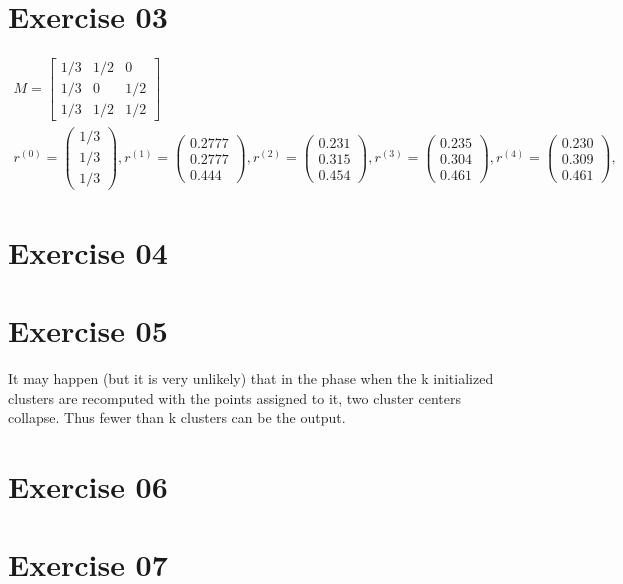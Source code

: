 \documentclass[11pt,a4paper]{scrartcl}
\begin{document}
\section*{Exercise 03}
\begin{align*}
M =
 \begin{bmatrix}
1/3 & 1/2 & 0 \\
1/3 & 0 & 1/2  \\
1/3 & 1/2 & 1/2
\end{bmatrix} \\
r^{(0)} = \left( \begin{array}{c}1/3\\1/3\\1/3\end{array} \right), 
r^{(1)} = \left( \begin{array}{c}0.2777\\0.2777\\0.444\end{array} \right), 
r^{(2)} = \left( \begin{array}{c}0.231\\0.315\\0.454\end{array} \right), 
r^{(3)} = \left( \begin{array}{c}0.235\\0.304\\0.461\end{array} \right), 
r^{(4)} = \left( \begin{array}{c}0.230\\0.309\\0.461\end{array} \right), 
\end{align*}

 



\section*{Exercise 04}
	

\section*{Exercise 05}
It may happen (but it is very unlikely) that in the phase when the k initialized clusters are recomputed with the points assigned to it, two cluster centers collapse. Thus fewer than k clusters can be the output.

\section*{Exercise 06}


\section*{Exercise 07}
\end{document}
